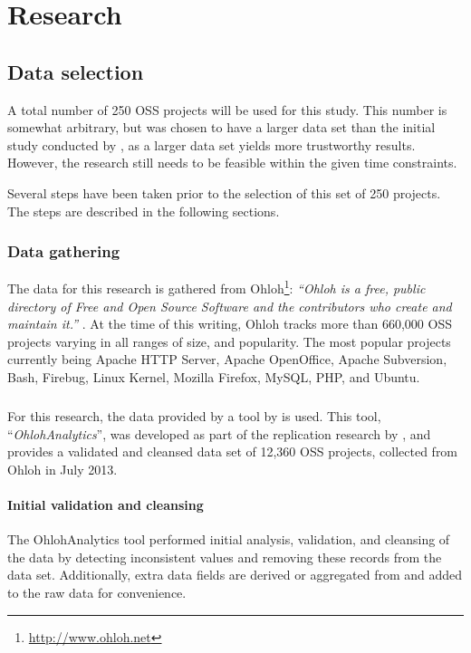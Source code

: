 \chapter{Research}
\label{research}

\section{Data selection}
\label{method:data}
A total number of 250 OSS projects will be used for this study. This number is
somewhat arbitrary, but was chosen to have a larger data set than the initial
study conducted by \citet{karus2013}, as a larger data set yields more
trustworthy results. However, the research still needs to be feasible within
the given time constraints.

Several steps have been taken prior to the selection of this set of 250
projects. The steps are described in the following sections.

\subsection{Data gathering}
The data for this research is gathered from
Ohloh\footnote{\url{http://www.ohloh.net}}: \textit{``Ohloh is a free, public
directory of Free and Open Source Software and the contributors who create and
maintain it.'' } \cite{ohloh}. At the time of this writing, Ohloh tracks more
than 660,000 OSS projects varying in all ranges of size, and popularity. The
most popular projects currently being Apache HTTP Server, Apache OpenOffice,
Apache Subversion, Bash, Firebug, Linux Kernel, Mozilla Firefox, MySQL, PHP,
and Ubuntu.

\paragraph{}
For this research, the data provided by a tool by \citet{ohlohanalytics} is
used. This tool, ``\textit{OhlohAnalytics}'', was developed as part of the
replication research by \citet{bruntink2013}, and provides a validated and
cleansed data set of 12,360 OSS projects, collected from Ohloh in July 2013.

\subsubsection{Initial validation and cleansing}
The OhlohAnalytics tool performed initial analysis, validation, and cleansing
of the data by detecting inconsistent values and removing these records from
the data set. Additionally, extra data fields are derived or aggregated from
and added to the raw data for convenience.

